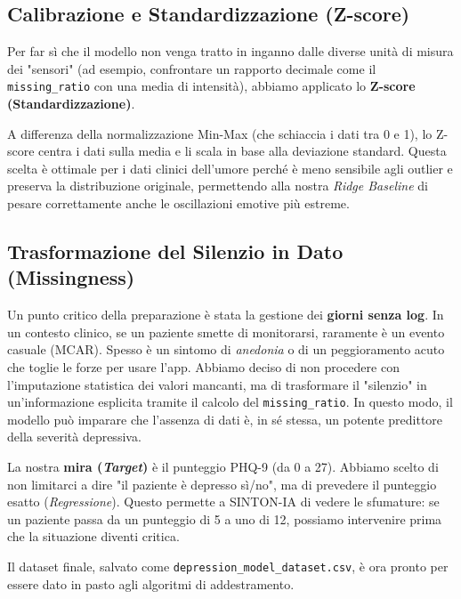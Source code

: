 \subsection{Calibrazione e Standardizzazione (Z-score)}
\label{subsec:scaling_depression}

Per far sì che il modello non venga tratto in inganno dalle diverse unità di misura dei "sensori" (ad esempio, confrontare un rapporto decimale come il \texttt{missing\_ratio} con una media di intensità), abbiamo applicato lo \textbf{Z-score (Standardizzazione)}. 

A differenza della normalizzazione Min-Max (che schiaccia i dati tra 0 e 1), lo Z-score centra i dati sulla media e li scala in base alla deviazione standard. Questa scelta è ottimale per i dati clinici dell'umore perché è meno sensibile agli outlier e preserva la distribuzione originale, permettendo alla nostra \textit{Ridge Baseline} di pesare correttamente anche le oscillazioni emotive più estreme.

\subsection{Trasformazione del Silenzio in Dato (Missingness)}
Un punto critico della preparazione è stata la gestione dei \textbf{giorni senza log}. In un contesto clinico, se un paziente smette di monitorarsi, raramente è un evento casuale (MCAR). Spesso è un sintomo di \textit{anedonia} o di un peggioramento acuto che toglie le forze per usare l'app. 
Abbiamo deciso di non procedere con l'imputazione statistica dei valori mancanti, ma di trasformare il "silenzio" in un'informazione esplicita tramite il calcolo del \texttt{missing\_ratio}. In questo modo, il modello può imparare che l'assenza di dati è, in sé stessa, un potente predittore della severità depressiva.

La nostra \textbf{mira (\textit{Target})} è il punteggio PHQ-9 (da 0 a 27). Abbiamo scelto di non limitarci a dire "il paziente è depresso sì/no", ma di prevedere il punteggio esatto (\textit{Regressione}). Questo permette a SINTON-IA di vedere le sfumature: se un paziente passa da un punteggio di 5 a uno di 12, possiamo intervenire prima che la situazione diventi critica.

Il dataset finale, salvato come \texttt{depression\_model\_dataset.csv}, è ora pronto per essere dato in pasto agli algoritmi di addestramento.

\clearpage
